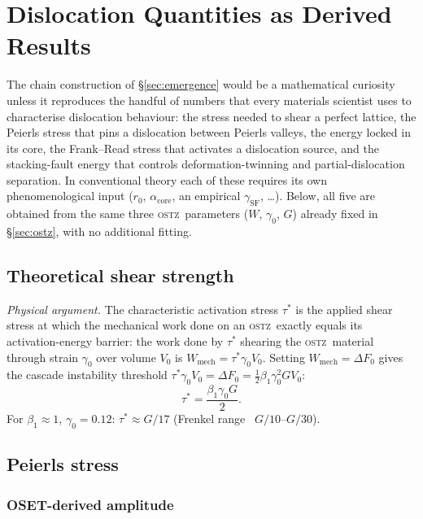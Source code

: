 \documentclass[5p,sort&compress]{elsarticle}
\newcommand{\OSTZ}{\textsc{ostz}}
\newcommand{\dF}{\Delta F_0}
\newcommand{\gz}{\gamma_0}
\newcommand{\half}{\tfrac{1}{2}}
\begin{document}
\section{Dislocation Quantities as Derived Results}
\label{sec:derived}

The chain construction of \S\ref{sec:emergence} would be a
mathematical curiosity unless it reproduces the handful of numbers
that every materials scientist uses to characterise dislocation
behaviour: the stress needed to shear a perfect lattice, the
Peierls stress that pins a dislocation between Peierls valleys, the
energy locked in its core, the Frank--Read stress that activates a
dislocation source, and the stacking-fault energy that controls
deformation-twinning and partial-dislocation separation. In
conventional theory each of these requires its own phenomenological
input ($r_0$, $\alpha_\text{core}$, an empirical $\gamma_\text{SF}$,
\ldots). Below, all five are obtained from the same three \OSTZ\
parameters ($W$, $\gz$, $G$) already fixed in \S\ref{sec:ostz},
with no additional fitting.

\subsection{Theoretical shear strength}
\label{sec:strength}

\textit{Physical argument.} The characteristic activation stress
$\tau^*$ is the applied shear stress at which the mechanical work
done on an \OSTZ\ exactly equals its activation-energy barrier: the
work done by $\tau^*$ shearing the \OSTZ\ material through strain
$\gz$ over volume $V_0$ is $W_\mathrm{mech}=\tau^*\gz V_0$. Setting
$W_\mathrm{mech}=\dF$ gives the cascade instability threshold
$\tau^*\gz V_0=\dF=\half\beta_1\gz^2GV_0$:
\begin{equation}
  \boxed{\tau^*=\frac{\beta_1\gz G}{2}.}
  \label{eq:strength}
\end{equation}
For $\beta_1\approx1$, $\gz=0.12$: $\tau^*\approx G/17$
(Frenkel range~\cite{frenkel1926} $G/10$--$G/30$).

\subsection{Peierls stress}
\label{sec:peierls}

\subsubsection{OSET-derived amplitude}
\end{document}
